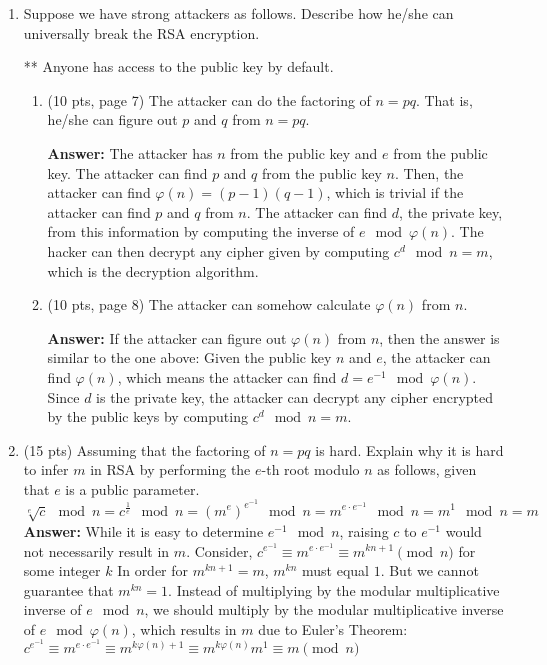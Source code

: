 \documentclass[10pt]{article}
\begin{document}
\begin{enumerate}
	\bigskip\item Suppose we have strong attackers as follows. Describe how he/she can universally break the RSA encryption.


** Anyone has access to the public key by default.
\begin{enumerate}
	\item (10 pts, page 7) The attacker can do the factoring of $n=pq$. That is, he/she can figure out $p$ and $q$ from $n=pq$.
	
	\textbf{Answer:} \newline The attacker has $n$ from the public key and $e$ from the public key. The attacker can find $p$ and $q$ from the public key $n$. Then, the attacker can find $\varphi(n)=(p-1)(q-1)$, which is trivial if the attacker can find $p$ and $q$ from $n$. The attacker can find $d$, the private key, from this information by computing the inverse of $e \mod\varphi(n)$. The hacker can then decrypt any cipher given by computing $c^d \mod n = m$, which is the decryption algorithm. \newline
	\bigskip\item (10 pts, page 8) The attacker can somehow calculate $\varphi(n)$ from $n$.
	
	\textbf{Answer:} \newline If the attacker can figure out $\varphi(n)$ from $n$, then the answer is similar to the one above: Given the public key $n$ and $e$, the attacker can find $\varphi(n)$, which means the attacker can find $d=e^{-1}\mod \varphi(n)$. Since $d$ is the private key, the attacker can decrypt any cipher encrypted by the public keys by computing $c^d \mod n = m$.
\end{enumerate}

\bigskip\item (15 pts) Assuming that the factoring of $n=pq$ is hard. Explain why it is hard to infer $m$ in RSA by performing the $e$-th root modulo $n$ as follows, given that $e$ is a public parameter.
\begin{displaymath}
\sqrt[e]{c}\mod n=c^{\frac{1}{e}}\mod n=(m^e)^{e^{-1}}\mod n=m^{e\cdot e^{-1}}\mod n=m^1\mod n=m
\end{displaymath}
\textbf{Answer:} \newline While it is easy to determine $e^{-1}\mod n$, raising $c$ to $e^{-1}$ would not necessarily result in $m$. Consider, \newline $c^{e^{-1}}\equiv m^{e\cdot e^{-1}}\equiv m^{kn+1}\pmod n$ for some integer $k$ \newline In order for $m^{kn+1}=m$, $m^{kn}$ must equal $1$. But we cannot guarantee that $m^{kn}=1$. Instead of multiplying by the modular multiplicative inverse of $e\mod n$, we should multiply by the modular multiplicative inverse of $e\mod \varphi(n)$, which results in $m$ due to Euler's Theorem: \newline $c^{e^{-1}}\equiv m^{e\cdot e^{-1}}\equiv m^{k\varphi(n)+1}\equiv m^{k\varphi(n)}m^{1}\equiv m\pmod n$


\end{enumerate}
\end{document}
